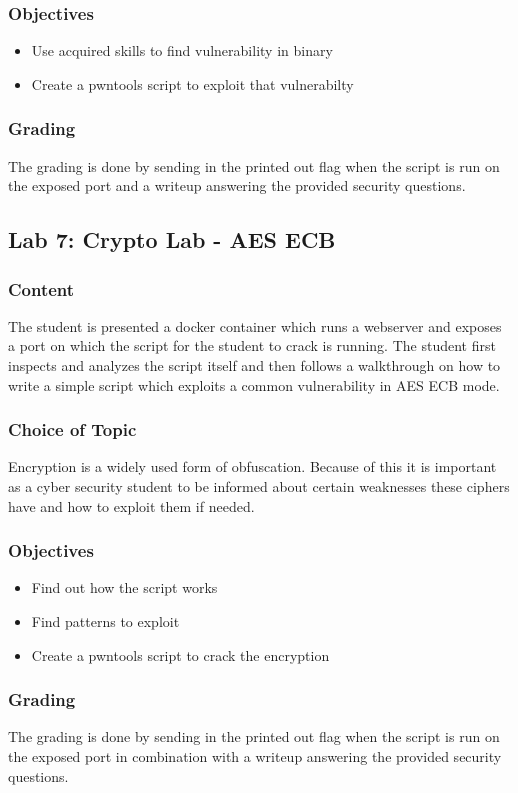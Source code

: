 \subsubsection*{Objectives}
\begin{itemize}
    \item Use acquired skills to find vulnerability in binary
    \item Create a pwntools script to exploit that vulnerabilty
\end{itemize}
\subsubsection*{Grading}
The grading is done by sending in the printed out flag when the script is run on the exposed port and a writeup answering the provided security questions.


\subsection{Lab 7: Crypto Lab - AES ECB}
\subsubsection*{Content}
The student is presented a docker container which runs a webserver and exposes a port on which the script for the student to crack is running. The student first inspects and analyzes the script itself and then follows a walkthrough on how to write a simple script which exploits a common vulnerability in AES ECB mode. 
\subsubsection*{Choice of Topic}
Encryption is a widely used form of obfuscation. Because of this it is important as a cyber security student to be informed about certain weaknesses these ciphers have and how to exploit them if needed. 
\subsubsection*{Objectives}
\begin{itemize}
    \item Find out how the script works
    \item Find patterns to exploit
    \item Create a pwntools script to crack the encryption
\end{itemize}
\subsubsection*{Grading}
The grading is done by sending in the printed out flag when the script is run on the exposed port in combination with a writeup answering the provided security questions.


